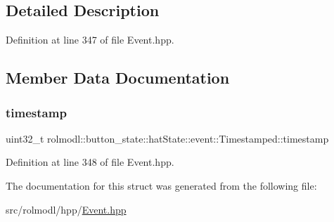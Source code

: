 \subsection{Detailed Description}


Definition at line 347 of file Event.\+hpp.



\subsection{Member Data Documentation}
\mbox{\label{structrolmodl_1_1button__state_1_1hat_state_1_1event_1_1_timestamped_a907b4efff3dbc08e4c64511f03f39071}} 
\subsubsection{\texorpdfstring{timestamp}{timestamp}}
{\footnotesize\ttfamily uint32\+\_\+t rolmodl\+::button\+\_\+state\+::hat\+State\+::event\+::\+Timestamped\+::timestamp}



Definition at line 348 of file Event.\+hpp.



The documentation for this struct was generated from the following file\+:\begin{DoxyCompactItemize}
\item 
src/rolmodl/hpp/\mbox{\hyperlink{_event_8hpp}{Event.\+hpp}}\end{DoxyCompactItemize}
